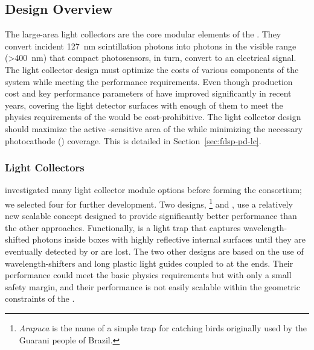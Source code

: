 \subsection{Design Overview}
\label{sec:pds:des-ov}

The  large-area light collectors are the core modular elements of the .  They convert incident \SI{127}{nm} scintillation photons into photons in the visible range (>\SI{400}{nm}) that compact  photosensors, in turn,  convert to an electrical signal. The light collector design must optimize the costs of various components of the system while meeting the performance requirements.  Even though production cost and key performance parameters of  have improved significantly in recent years, covering the light detector surfaces with enough of them to meet the physics requirements of the  would be cost-prohibitive. 
The light collector design should maximize the active -sensitive area of the  while minimizing the necessary photocathode () coverage. This is detailed in
Section~\ref{sec:fdsp-pd-lc}.

\subsubsection{Light Collectors} 
\label{sssec:photoncollectors}

 investigated many  light collector module options before forming the   consortium; we selected four for further development. 
Two designs, \footnote{\textit{Arapuca} is the name of a simple trap for catching birds originally used by the Guarani people of Brazil.} %
and , %
use a relatively new scalable concept designed to provide  
significantly better performance than the other approaches. Functionally,  is a light trap that captures wavelength-shifted photons inside boxes with highly reflective internal surfaces until they are eventually detected by  or are lost.  The two other designs are based on the use of wavelength-shifters and long plastic light guides coupled to  at the ends. Their performance could meet the basic physics requirements but with only a small safety margin, and their performance is not easily scalable within the geometric constraints of the . 


